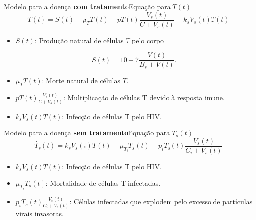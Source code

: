 \documentclass[13pt]{beamer}
\begin{document}
\begin{frame}{Modelo para a doença \textbf{com tratamento}}{Equação para \( T ( t ) \)}
    \begin{equation*}
        \dot{ T } ( t ) = S ( t ) - \mu_{ T } T ( t ) + p T ( t ) \frac{ V_{ s } ( t ) }{ C + V_{ s } ( t ) } - k_{ s } V_{ s } ( t ) T ( t ) \label{Tponto_S}
    \end{equation*}
    \begin{itemize}
        \item<2-> \( S ( t ) \): Produção natural de células \( T \) pelo corpo

            \begin{equation*}
                S ( t ) = 10 - 7 \frac{ V ( t ) }{ B_{ s } + V ( t ) }
            .\end{equation*}

        \item<3-> \( \mu_{ T } T ( t ) \): Morte natural de células \( T \).
        \item<4-> \( p T ( t ) \frac{ V_{ s } ( t ) }{ C + V_{ s } ( t ) } \): Multiplicação de células T devido à resposta imune.
        \item<5-> \( k_{ s } V_{ s } ( t ) T ( t ) \): Infecção de células T pelo HIV.
    \end{itemize}
\end{frame}

\begin{frame}{Modelo para a doença \textbf{sem tratamento}}{Equação para \( T_{ s } ( t ) \)}
    \begin{equation*}
        \dot{T_{ s }} ( t ) = k_{ s } V_{ s } ( t ) T ( t ) - \mu_{ T_{ i } } T_{ s } ( t ) - p_{ i } T_{ s } ( t ) \frac{ V_{ s } ( t ) }{ C_{ i } + V_{ s } ( t ) } \label{Tsponto_S}
    \end{equation*}
    \begin{itemize}
        \item<2-> \( k_{ s } V_{ s } ( t ) T ( t ) \): Infecção de células T pelo HIV.
        \item<3-> \( \mu_{ T_{ i } } T_{ s } ( t ) \): Mortalidade de células T infectadas.
        \item<4-> \( p_{ i } T_{ s } ( t ) \frac{ V_{ s } ( t ) }{ C_{ i } + V_{ s } ( t ) } \): Células infectadas que explodem pelo excesso de partículas virais invasoras.
    \end{itemize}
\end{frame}
\end{document}

